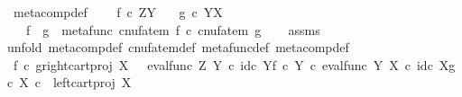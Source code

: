\begin{isabellebody}
\isanewline
{}\isamarkupfalse%
%
\endisatagproof
{\isafoldproof}%
%
\isadelimproof
\isanewline
%
\endisadelimproof
\isanewline
{}\isamarkupfalse%
\ meta{\isacharunderscore}{\kern0pt}comp{}{\isacharunderscore}{\kern0pt}def{}{\isacharcolon}{\kern0pt}\ \isanewline
\ \ \ {\isachardoublequoteopen}f\ {\isasymin}\isactrlsub c\ Z\isactrlbsup Y\isactrlesup {\isachardoublequoteclose}\isanewline
\ \ \ {\isachardoublequoteopen}g\ {\isasymin}\isactrlsub c\ Y\isactrlbsup X\isactrlesup {\isachardoublequoteclose}\isanewline
\ \ \ {\isachardoublequoteopen}f\ {\isasymbox}\ g\ {\isacharequal}{\kern0pt}\ metafunc\ {\isacharparenleft}{\kern0pt}{\isacharparenleft}{\kern0pt}cnufatem\ f{\isacharparenright}{\kern0pt}\ {\isasymcirc}\isactrlsub c\ {\isacharparenleft}{\kern0pt}cnufatem\ g{\isacharparenright}{\kern0pt}{\isacharparenright}{\kern0pt}{\isachardoublequoteclose}\isanewline
%
\isadelimproof
\ \ %
\endisadelimproof
%
\isatagproof
{}\isamarkupfalse%
\ assms\isanewline
{}\isamarkupfalse%
{\isacharparenleft}{\kern0pt}unfold\ meta{\isacharunderscore}{\kern0pt}comp{}{\isacharunderscore}{\kern0pt}def{}\ cnufatem{\isacharunderscore}{\kern0pt}def{}\ metafunc{\isacharunderscore}{\kern0pt}def\ meta{\isacharunderscore}{\kern0pt}comp{\isacharunderscore}{\kern0pt}def{\isacharparenright}{\kern0pt}\ \ \ \ \ \ \ \ \ \ \isanewline
\ \ \isamarkupfalse%
\ {\isachardoublequoteopen}f\isactrlsup {\isasymflat}\ {\isasymcirc}\isactrlsub c\ {\isasymlangle}g\isactrlsup {\isasymflat}{\isacharcomma}{\kern0pt}right{\isacharunderscore}{\kern0pt}cart{\isacharunderscore}{\kern0pt}proj\ X\ {\isasymone}{\isasymrangle}\ {\isacharequal}{\kern0pt}\ {\isacharparenleft}{\kern0pt}{\isacharparenleft}{\kern0pt}eval{\isacharunderscore}{\kern0pt}func\ Z\ Y\ {\isasymcirc}\isactrlsub c\ {\isasymlangle}id\isactrlsub c\ Y{\isacharcomma}{\kern0pt}f\ {\isasymcirc}\isactrlsub c\ {\isasymbeta}\isactrlbsub Y\isactrlesub {\isasymrangle}{\isacharparenright}{\kern0pt}\ {\isasymcirc}\isactrlsub c\ eval{\isacharunderscore}{\kern0pt}func\ Y\ X\ {\isasymcirc}\isactrlsub c\ {\isasymlangle}id\isactrlsub c\ X{\isacharcomma}{\kern0pt}g\ {\isasymcirc}\isactrlsub c\ {\isasymbeta}\isactrlbsub X\isactrlesub {\isasymrangle}{\isacharparenright}{\kern0pt}\ {\isasymcirc}\isactrlsub c\ \ left{\isacharunderscore}{\kern0pt}cart{\isacharunderscore}{\kern0pt}proj\ X\ {\isasymone}{\isachardoublequoteclose}\isanewline
\ \ \isamarkupfalse%

\end{isabellebody}
